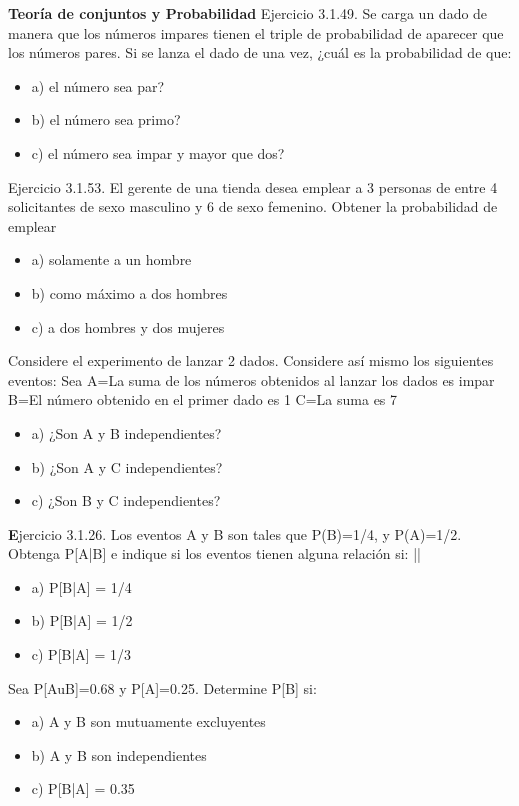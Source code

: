 \documentclass{oxmathproblems}
\begin{document}
\begin{questions}

\miquestion \textbf{Teoría de conjuntos y Probabilidad} Ejercicio 3.1.49. Se carga un dado de manera que los números impares tienen el triple de probabilidad de aparecer que  los números pares. Si se lanza el dado de una vez, ¿cuál es la probabilidad de que: 
\begin{itemize}
\item  a) el número sea par?
\item  b) el número sea primo?
\item  c) el número sea impar y mayor que dos?
\end{itemize}

\miquestion Ejercicio 3.1.53. El gerente de una tienda desea emplear a 3 personas de entre 4 solicitantes de sexo masculino y 6 de sexo femenino. Obtener la probabilidad de emplear 
\begin{itemize}
\item  a) solamente a un hombre
\item  b) como máximo a dos hombres
\item  c) a dos hombres y dos mujeres
\end{itemize}

\miquestion Considere el experimento de lanzar 2 dados. Considere así mismo los siguientes eventos: Sea 
A={La suma de los números obtenidos al lanzar los dados es impar}
B={El número obtenido en el primer dado es 1}
C={La suma es 7}
\begin{itemize}
 \item a) ¿Son A y B independientes?
\item b) ¿Son A y C independientes?
\item c) ¿Son B y C independientes?
\end{itemize}
\miquestion \textbf 
Ejercicio 3.1.26. Los eventos A y B son tales que P(B)=1/4, y P(A)=1/2. Obtenga P[A|B] e indique si los eventos tienen alguna relación si: ||
\begin{itemize}
 \item a) P[B|A] = 1/4
 \item b) P[B|A] = 1/2
 \item  c) P[B|A] = 1/3
\end{itemize}

\miquestion Sea P[AuB]=0.68 y P[A]=0.25. Determine P[B] si: 
\begin{itemize}
 \item a) A y B son mutuamente excluyentes 
 \item b) A y B son independientes
 \item  c) P[B|A] = 0.35 
\end{itemize}


\end{questions}
\end{document}
